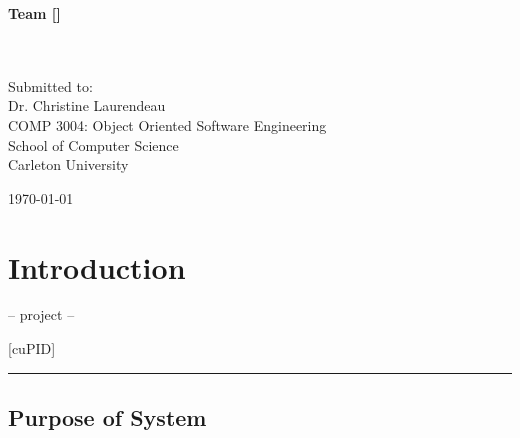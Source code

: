\documentclass[12pt,letterpaper]{article}
\begin{document}
\begin{center}
	\textbf{Team [\teamname{}]}\\
	\personone{}\\
	\persontwo{}\\
	\personthree{}
\end{center}

\vfill

\begin{center}
	Submitted to:\\
	Dr. Christine Laurendeau\\
	COMP 3004: Object Oriented Software Engineering\\
	School of Computer Science\\
	Carleton University
\end{center}

\vspace{2em}

\begin{center}
	\today
\end{center}

\newpage{}

\tableofcontents{}

\renewcommand{\listfigurename}{Figures}
\listoffigures

\renewcommand{\listtablename}{Tables}
\listoftables

\newpage{}

\section{Introduction}

\begin{center}
    -- project --
\end{center}

\begin{center}
	\Huge [cuPID]
\end{center}

\begin{center}
    \rule{0.85\textwidth}{0.5pt}
\end{center}

\subsection{Purpose of System}
\end{document}

